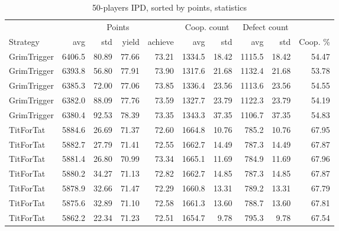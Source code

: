 \documentclass[journal,a4paper,10pt,twoside]{IEEEtran} %
\begin{document}
\begin{table}[ht]
	\caption{50-players IPD, sorted by points, statistics}
	\label{tab:ipdmp50}
	\centering
	\begin{tabular}{l|rrrr|rrrrr} \toprule
		                  &     \multicolumn{4}{c}{Points}     & \multicolumn{2}{c}{Coop. count} & \multicolumn{2}{c}{Defect count} &          \\
		Strategy          &    avg &    std &  yield & achieve &    avg &                    std &    avg &                     std & Coop. \% \\ \midrule
		GrimTrigger       & 6406.5 &  80.89 &  77.66 &   73.21 & 1334.5 &                  18.42 & 1115.5 &                   18.42 &    54.47 \\
		GrimTrigger       & 6393.8 &  56.80 &  77.91 &   73.90 & 1317.6 &                  21.68 & 1132.4 &                   21.68 &    53.78 \\
		GrimTrigger       & 6385.3 &  72.00 &  77.06 &   73.85 & 1336.4 &                  23.56 & 1113.6 &                   23.56 &    54.55 \\
		GrimTrigger       & 6382.0 &  88.09 &  77.76 &   73.59 & 1327.7 &                  23.79 & 1122.3 &                   23.79 &    54.19 \\
		GrimTrigger       & 6380.4 &  92.53 &  78.39 &   73.35 & 1343.3 &                  37.35 & 1106.7 &                   37.35 &    54.83 \\
		TitForTat         & 5884.6 &  26.69 &  71.37 &   72.60 & 1664.8 &                  10.76 &  785.2 &                   10.76 &    67.95 \\
		TitForTat         & 5882.7 &  27.79 &  71.41 &   72.55 & 1662.7 &                  14.49 &  787.3 &                   14.49 &    67.87 \\
		TitForTat         & 5881.4 &  26.80 &  70.99 &   73.34 & 1665.1 &                  11.69 &  784.9 &                   11.69 &    67.96 \\
		TitForTat         & 5880.2 &  34.27 &  71.13 &   72.82 & 1662.7 &                  14.85 &  787.3 &                   14.85 &    67.87 \\
		TitForTat         & 5878.9 &  32.66 &  71.47 &   72.29 & 1660.8 &                  13.31 &  789.2 &                   13.31 &    67.79 \\
		TitForTat         & 5875.6 &  32.89 &  71.10 &   72.58 & 1661.3 &                  13.60 &  788.7 &                   13.60 &    67.81 \\
		TitForTat         & 5862.2 &  22.34 &  71.23 &   72.51 & 1654.7 &                   9.78 &  795.3 &                    9.78 &    67.54 \\

\end{tabular}
\end{table}
\end{document}

